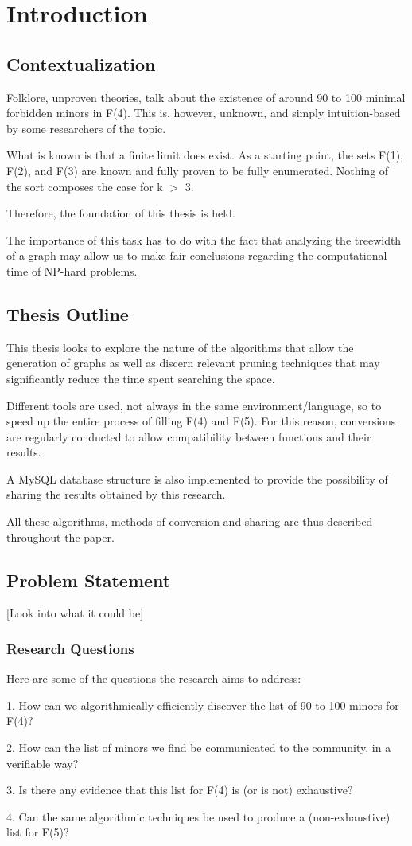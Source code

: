 \section{Introduction}

\subsection{Contextualization}
Folklore, unproven theories, talk about the existence of around 90 to 100 minimal forbidden minors in F(4). This is, however, unknown, and simply intuition-based by some researchers of the topic.

What is known is that a finite limit does exist. As a starting point, the sets F(1), F(2), and F(3) are known and fully proven to be fully enumerated. Nothing of the sort composes the case for k $>$ 3.

Therefore, the foundation of this thesis is held.

The importance of this task has to do with the fact that analyzing the treewidth of a graph may allow us to make fair conclusions regarding the computational time of NP-hard problems.

\subsection{Thesis Outline}
This thesis looks to explore the nature of the algorithms that allow the generation of graphs as well as discern relevant pruning techniques that may significantly reduce the time spent searching the space.

Different tools are used, not always in the same environment/language, so to speed up the entire process of filling F(4) and F(5). For this reason, conversions are regularly conducted to allow compatibility between functions and their results.

A MySQL database structure is also implemented to provide the possibility of sharing the results obtained by this research. 

All these algorithms, methods of conversion and sharing are thus described throughout the paper.

\subsection{Problem Statement }
[Look into what it could be]
\subsubsection{Research Questions}
Here are some of the questions the research aims to address:

1. How can we algorithmically efficiently discover the list of 90 to 100 minors for F(4)?

2. How can the list of minors we find be communicated to the community, in a verifiable way?

3. Is there any evidence that this list for F(4) is (or is not) exhaustive?

4. Can the same algorithmic techniques be used to produce a (non-exhaustive) list for F(5)?

